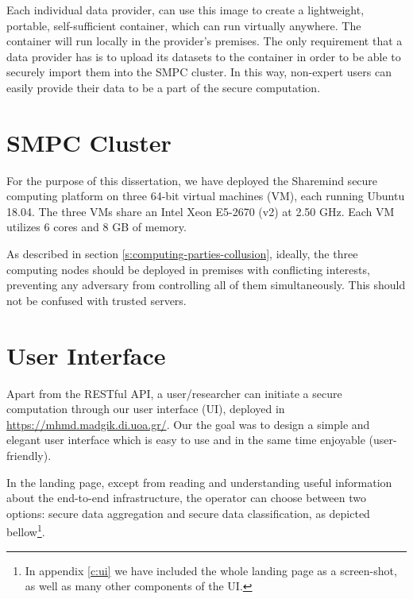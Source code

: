 Each individual data provider, can use this image to create a lightweight, portable, self-sufficient container, which can run virtually anywhere.
The container will run locally in the provider's premises.
The only requirement that a data provider has is to upload its datasets to the container in order to be able to securely import them into the SMPC cluster. In this way, non-expert users can easily provide their data to be a part of the secure computation.




\section{SMPC Cluster}\label{s:impl-smpc-cluster}
For the purpose of this dissertation, we have deployed the Sharemind secure computing platform on three 64\hyp bit virtual machines (VM), each running Ubuntu 18.04.
The three VMs share an Intel Xeon E5-2670 (v2) at 2.50 GHz.
Each VM utilizes 6 cores and 8 GB of memory.

As described in section \ref{s:computing-parties-collusion}, ideally, the three computing nodes should be deployed in premises with conflicting interests, preventing any adversary from controlling all of them simultaneously.
This should not be confused with trusted servers.





\section{User Interface}\label{s:impl-ui}
Apart from the RESTful API, a user/researcher can initiate a secure computation through our user interface (UI), deployed in \href{https://mhmd.madgik.di.uoa.gr/}{https://mhmd.madgik.di.uoa.gr/}.
Our the goal was to design a simple and elegant user interface which is easy to use and in the same time enjoyable (user\hyp friendly).


In the landing page, except from reading and understanding useful information about the end\hyp to\hyp end infrastructure, the operator can choose between two options: secure data aggregation and secure data classification, as depicted bellow\footnote{In appendix \ref{c:ui} we have included the whole landing page as a screen\hyp shot, as well as many other components of the UI.}.

